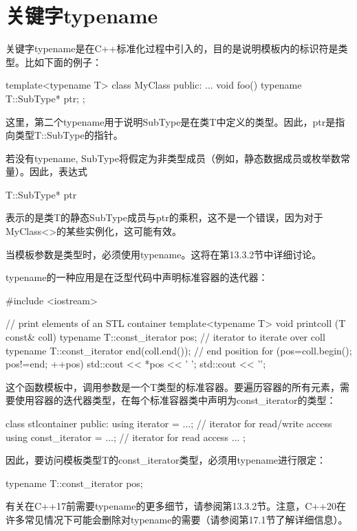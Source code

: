 \section{关键字typename}
关键字typename是在C++标准化过程中引入的，目的是说明模板内的标识符是类型。比如下面的例子：

\begin{cpp}
template<typename T>
class MyClass {
	public:
	...
	void foo() {
		typename T::SubType* ptr;
	}
};
\end{cpp}

这里，第二个typename用于说明SubType是在类T中定义的类型。因此，ptr是指向类型T::SubType的指针。

若没有typename, SubType将假定为非类型成员（例如，静态数据成员或枚举数常量）。因此，表达式

\begin{cpp}
T::SubType* ptr
\end{cpp}

表示的是类T的静态SubType成员与ptr的乘积，这不是一个错误，因为对于MyClass<>的某些实例化，这可能有效。

当模板参数是类型时，必须使用typename。这将在第13.3.2节中详细讨论。

typename的一种应用是在泛型代码中声明标准容器的迭代器：

\begin{cpp}
#include <iostream>

// print elements of an STL container
template<typename T>
void printcoll (T const& coll) {
	typename T::const_iterator pos; // iterator to iterate over coll
	typename T::const_iterator end(coll.end()); // end position
	for (pos=coll.begin(); pos!=end; ++pos) {
		std::cout << *pos << ' ';
	}
	std::cout << '\n';
}
\end{cpp}

这个函数模板中，调用参数是一个T类型的标准容器。要遍历容器的所有元素，需要使用容器的迭代器类型，在每个标准容器类中声明为const\_iterator的类型：

\begin{cpp}
class stlcontainer {
	public:
	using iterator = ...; // iterator for read/write access
	using const_iterator = ...; // iterator for read access
	...
};
\end{cpp}

因此，要访问模板类型T的const\_iterator类型，必须用typename进行限定：

\begin{cpp}
typename T::const_iterator pos;
\end{cpp}

有关在C++17前需要typename的更多细节，请参阅第13.3.2节。注意，C++20在许多常见情况下可能会删除对typename的需要（请参阅第17.1节了解详细信息）。











